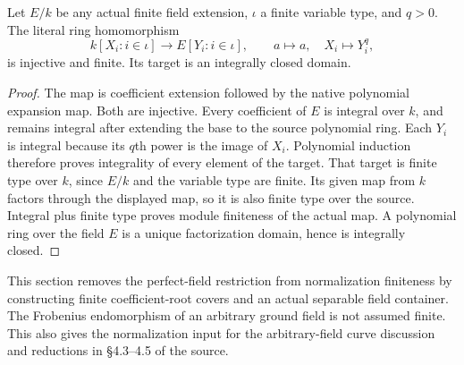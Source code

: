 \begin{lemma}
\label{lem:normalization-finite-polynomial-root-cover}
\leanok
Let $E/k$ be any actual finite field extension, $\iota$ a finite variable
type, and $q>0$. The literal ring homomorphism
\[
 k[X_i:i\in\iota]\longrightarrow E[Y_i:i\in\iota],
 \qquad a\longmapsto a,\quad X_i\longmapsto Y_i^q,
\]
is injective and finite. Its target is an integrally closed domain.
\end{lemma}
\begin{proof}
The map is coefficient extension followed by the native polynomial
expansion map. Both are injective. Every coefficient of $E$ is integral
over $k$, and remains integral after extending the base to the source
polynomial ring. Each $Y_i$ is integral because its $q$th power is the
image of $X_i$. Polynomial induction therefore proves integrality of
every element of the target. That target is finite type over $k$, since
$E/k$ and the variable type are finite. Its given map from $k$ factors
through the displayed map, so it is also finite type over the source.
Integral plus finite type proves module finiteness of the actual map.
A polynomial ring over the field $E$ is a unique factorization domain,
hence is integrally closed.
\end{proof}

\endgroup

\begingroup

This section removes the perfect-field restriction from normalization
finiteness by constructing finite coefficient-root covers and an actual
separable field container. The Frobenius endomorphism of an arbitrary
ground field is not assumed finite. This also gives the normalization
input for the arbitrary-field curve discussion and reductions in
\S4.3--4.5 of the source.

